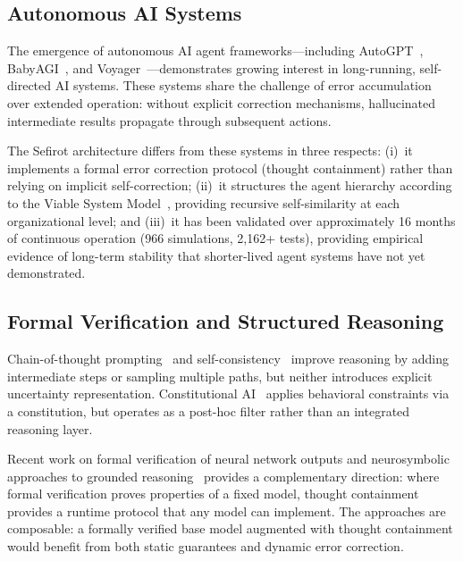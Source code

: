 \documentclass[11pt]{article}
\theoremstyle{definition}
\theoremstyle{remark}
\begin{document}
\subsection{Autonomous AI Systems}
\label{sec:related-autonomous}

The emergence of autonomous AI agent frameworks---including
AutoGPT~\cite{yang2023autogpt}, BabyAGI~\cite{nakajima2023babyagi},
and Voyager~\cite{wang2023voyager}---demonstrates growing interest in
long-running, self-directed AI systems.  These systems share the challenge
of error accumulation over extended operation: without explicit correction
mechanisms, hallucinated intermediate results propagate through subsequent
actions.

The Sefirot architecture differs from these systems in three respects:
(i)~it implements a formal error correction protocol (thought containment)
rather than relying on implicit self-correction; (ii)~it structures the
agent hierarchy according to the Viable System Model~\cite{beer1972},
providing recursive self-similarity at each organizational level; and
(iii)~it has been validated over approximately 16 months of continuous
operation (966 simulations, 2,162+ tests), providing empirical evidence
of long-term stability that shorter-lived agent systems have not yet
demonstrated.

\subsection{Formal Verification and Structured Reasoning}
\label{sec:related-formal}

Chain-of-thought prompting~\cite{wei2022cot} and
self-consistency~\cite{wang2023self} improve reasoning by adding intermediate
steps or sampling multiple paths, but neither introduces explicit uncertainty
representation.  Constitutional AI~\cite{bai2022constitutional} applies
behavioral constraints via a constitution, but operates as a post-hoc filter
rather than an integrated reasoning layer.

Recent work on formal verification of neural network outputs and
neurosymbolic approaches to grounded reasoning~\cite{pan2023logic} provides
a complementary direction: where formal verification proves properties of a
fixed model, thought containment provides a runtime protocol that any model
can implement.  The approaches are composable: a formally verified base model
augmented with thought containment would benefit from both static guarantees
and dynamic error correction.
\end{document}
